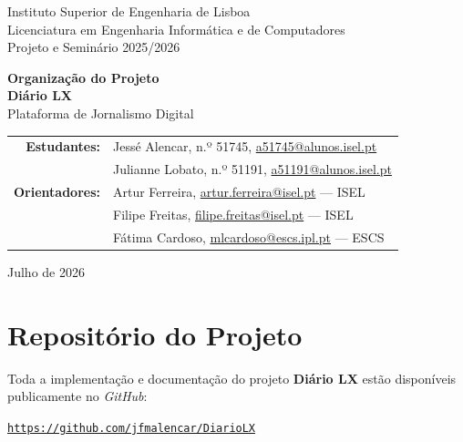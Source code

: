 \documentclass[12pt,a4paper]{article}
\begin{document}
\begin{titlepage}
  \centering
  \vspace*{1cm}

  {\Large Instituto Superior de Engenharia de Lisboa}\\[0.3cm]
  {\large Licenciatura em Engenharia Informática e de Computadores}\\[0.2cm]
  {\large Projeto e Seminário 2025/2026}

  \vspace{2cm}
  {\LARGE \textbf{Organização do Projeto}}\\[0.5cm]
  {\Huge \textbf{\textcolor{iselred}{Diário LX}}}\\[0.3cm]
  {\large Plataforma de Jornalismo Digital}

  \vspace{2.5cm}
  \begin{tabular}{rl}
    \textbf{Estudantes:}   & Jessé Alencar, n.º 51745, \href{mailto:a51745@alunos.isel.pt}{a51745@alunos.isel.pt}   \\[0.2cm]
                           & Julianne Lobato, n.º 51191, \href{mailto:a51191@alunos.isel.pt}{a51191@alunos.isel.pt} \\[0.5cm]
    \textbf{Orientadores:} & Artur Ferreira, \href{mailto:artur.ferreira@isel.pt}{artur.ferreira@isel.pt} — ISEL    \\[0.2cm]
                           & Filipe Freitas, \href{mailto:filipe.freitas@isel.pt}{filipe.freitas@isel.pt} — ISEL    \\[0.2cm]
                           & Fátima Cardoso, \href{mailto:mlcardoso@escs.ipl.pt}{mlcardoso@escs.ipl.pt} — ESCS      \\
  \end{tabular}

  \vspace{2.5cm}
  {\large Julho de 2026}

  \vfill
\end{titlepage}

\section{Repositório do Projeto}

Toda a implementação e documentação do projeto
\textbf{Diário LX} estão disponíveis publicamente no \textit{GitHub}:

\begin{center}
  \href{https://github.com/jfmalencar/DiarioLX}{\texttt{https://github.com/jfmalencar/DiarioLX}}
\end{center}
\end{document}
